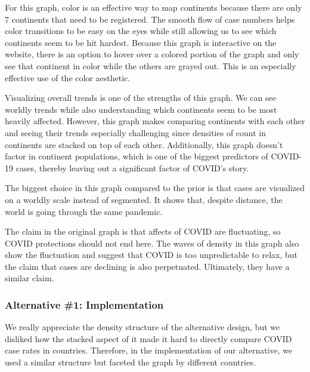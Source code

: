 \documentclass[
]{article}
\begin{document}
For this graph, color is an effective way to map continents because
there are only 7 continents that need to be registered. The smooth flow
of case numbers helps color transitions to be easy on the eyes while
still allowing us to see which continents seem to be hit hardest.
Because this graph is interactive on the website, there is an option to
hover over a colored portion of the graph and only see that continent in
color while the others are grayed out. This is an especially effective
use of the color aesthetic.

Visualizing overall trends is one of the strengths of this graph. We can
see worldly trends while also understanding which continents seem to be
most heavily affected. However, this graph makes comparing continents
with each other and seeing their trends especially challenging since
densities of count in continents are stacked on top of each other.
Additionally, this graph doesn't factor in continent populations, which
is one of the biggest predictors of COVID-19 cases, thereby leaving out
a significant factor of COVID's story.

The biggest choice in this graph compared to the prior is that cases are
visualized on a worldly scale instead of segmented. It shows that,
despite distance, the world is going through the same pandemic.

The claim in the original graph is that affects of COVID are
fluctuating, so COVID protections should not end here. The waves of
density in this graph also show the fluctuation and suggest that COVID
is too unpredictable to relax, but the claim that cases are declining is
also perpetuated. Ultimately, they have a similar claim.

\hypertarget{alternative-1-implementation}{%
\subsubsection{Alternative \#1:
Implementation}\label{alternative-1-implementation}}

We really appreciate the density structure of the alternative design,
but we disliked how the stacked aspect of it made it hard to directly
compare COVID case rates in countries. Therefore, in the implementation
of our alternative, we used a similar structure but faceted the graph by
different countries.
\end{document}
